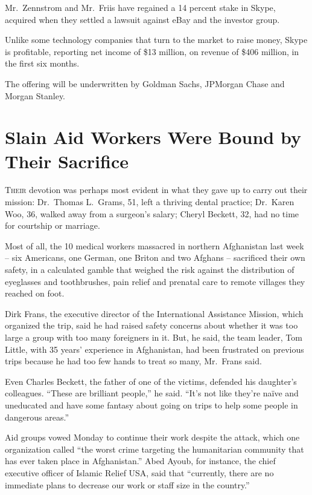 ﻿\documentclass[12pt]{article}
\begin{document}
Mr.~Zennstrom and Mr.~Friis have regained a 14 percent stake in Skype, acquired when they settled a
lawsuit against eBay and the investor group.

Unlike some technology companies that turn to the market to raise money, Skype is profitable,
reporting net income of \$13 million, on revenue of \$406 million, in the first six months.

The offering will be underwritten by Goldman Sachs, JPMorgan Chase and Morgan Stanley.

\section{Slain Aid Workers Were Bound by Their Sacrifice}

\lettrine{T}{heir} devotion was perhaps most evident in what they gave up to
carry out their mission: Dr.~Thomas L.~Grams, 51, left a thriving dental practice; Dr.~Karen Woo,
36, walked away from a surgeon's salary; Cheryl Beckett, 32, had no time for courtship or marriage.

Most of all, the 10 medical workers massacred in northern Afghanistan last week -- six Americans,
one German, one Briton and two Afghans -- sacrificed their own safety, in a calculated gamble that
weighed the risk against the distribution of eyeglasses and toothbrushes, pain relief and prenatal
care to remote villages they reached on foot.

Dirk Frans, the executive director of the International Assistance Mission, which organized the
trip, said he had raised safety concerns about whether it was too large a group with too many
foreigners in it. But, he said, the team leader, Tom Little, with 35 years' experience in
Afghanistan, had been frustrated on previous trips because he had too few hands to treat so many,
Mr.~Frans said.

Even Charles Beckett, the father of one of the victims, defended his daughter's colleagues. ``These
are brilliant people,'' he said. ``It's not like they're na\"ive and uneducated and have some
fantasy about going on trips to help some people in dangerous areas.''

Aid groups vowed Monday to continue their work despite the attack, which one organization called
``the worst crime targeting the humanitarian community that has ever taken place in Afghanistan.''
Abed Ayoub, for instance, the chief executive officer of Islamic Relief USA, said that ``currently,
there are no immediate plans to decrease our work or staff size in the country.''
\end{document}
